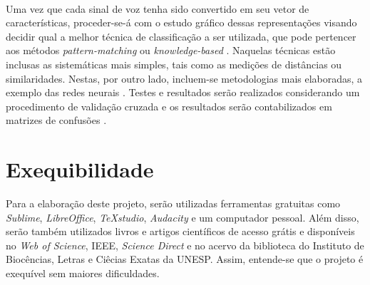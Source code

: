 \documentclass[a4paper,12pt,twoside,openright]{report}
\begin{document}
\\
\par Uma vez que cada sinal de voz tenha sido convertido em seu vetor de caracter\'{i}sticas, proceder-se-\'{a} com o estudo gr\'{a}fico dessas representa\c{c}\~{o}es visando decidir qual a melhor t\'{e}cnica de classifica\c{c}\~{a}o a ser utilizada, que pode pertencer aos m\'{e}todos \textit{pattern-matching} ou \textit{knowledge-based} \cite{Pattern_Recognition}. Naquelas t\'{e}cnicas est\~{a}o inclusas as sistem\'{a}ticas mais simples, tais como as medi\c{c}\~{o}es de dist\^{a}ncias ou similaridades. Nestas, por outro lado, incluem-se metodologias mais elaboradas, a exemplo das redes neurais \cite{pattern_classification}. Testes e resultados ser\~{a}o realizados considerando um procedimento de valida\c{c}\~{a}o cruzada e os resultados ser\~{a}o contabilizados em matrizes de confus\~{o}es \cite{pattern_classification}.
\section{Exequibilidade}
\par Para a elabora{\c c}\~{a}o deste projeto, ser\~{a}o utilizadas ferramentas gratuitas como \textit{Sublime}, \textit{LibreOffice}, \textit{TeXstudio}, \textit{Audacity} e um computador pessoal. Al\'{e}m disso, ser\~{a}o tamb\'{e}m utilizados livros e artigos cient\'{i}ficos de acesso gr\'{a}tis e dispon\'{i}veis no \textit{Web of Science}, IEEE, \textit{Science Direct} e no acervo da biblioteca do Instituto de Bioc\^{e}ncias, Letras e Ci\^{e}cias Exatas da UNESP. Assim, entende-se que o projeto \'{e} exequ\'{i}vel sem maiores dificuldades.
\end{document}
